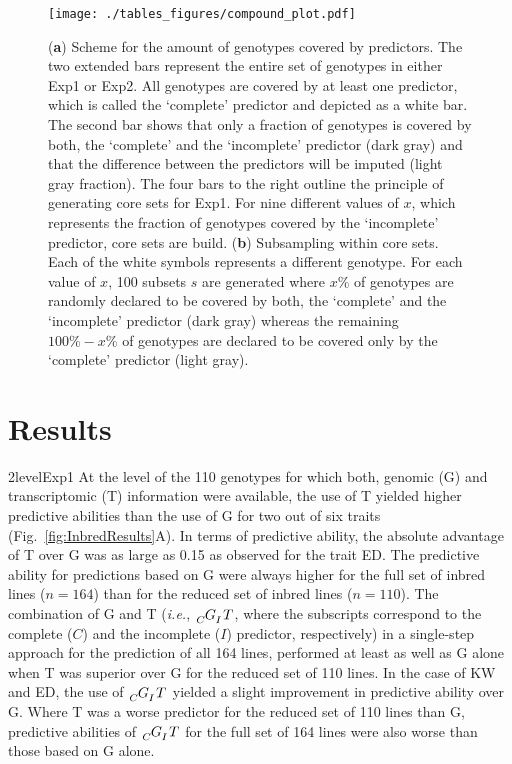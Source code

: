 \documentclass[12pt,titlepage]{article}
\begin{document}
\begin{figure}[H]
  \centering
  \texttt{[image: ./tables\_figures/compound\_plot.pdf]}
  \caption{
  (\textbf{a}) Scheme for the amount of genotypes covered by predictors.
  The two extended bars represent the entire set of genotypes in either
  Exp1 or Exp2.
  All genotypes are covered by at least one predictor, which is called the
  `complete' predictor and depicted as a white bar.
  The second bar shows that only a fraction of genotypes is covered by both,
  the `complete' and the `incomplete' predictor (dark gray) and that the
  difference between the predictors will be imputed (light gray fraction).
  The four bars to the right outline the principle of generating core sets for
  Exp1.
  For nine different values of $x$, which represents the fraction of genotypes
  covered by the `incomplete' predictor, core sets are build.
  (\textbf{b}) Subsampling within core sets.
  Each of the white symbols represents a different genotype.
  For each value of $x$, 100 subsets $s$ are generated where $x\%$ of genotypes
  are randomly declared to be covered by both, the `complete' and the
  `incomplete' predictor (dark gray) whereas the remaining $100\% - x\%$ of
  genotypes are declared to be covered only by the `complete' predictor (light
  gray).
  }
\label{fig:compound-plot}
\end{figure}



\section*{Results}
\Genetics2level{Exp1}
At the level of the 110 genotypes for which both, genomic (G) and 
transcriptomic (T) information were available, the use of T yielded higher
predictive abilities than the use of G for two out of six traits
(Fig.~\ref{fig:InbredResults}A).
In terms of predictive ability, the absolute advantage of T over G was as large 
as 0.15 as observed for the trait ED\@.
The predictive ability for predictions based on G were always higher for the
full set of inbred lines ($n = 164$) than for the reduced set of inbred lines
($n = 110$).
The combination of G and T (\textit{i.e.}, $\tensor[_{C}]{G}{}
\tensor[_{I}]{T}{}$, where the subscripts correspond to the complete ($C$) and
the incomplete ($I$) predictor, respectively) in a single-step approach for the 
prediction of all 164 lines, performed at least as well as G alone when T was 
superior over G for the reduced set of 110 lines.
In the case of KW and ED, the use of $\tensor[_{C}]{G}{}\tensor[_{I}]{T}{}$
yielded a slight improvement in predictive ability over G.
Where T was a worse predictor for the reduced set of 110 lines than G,
predictive abilities of $\tensor[_{C}]{G}{}\tensor[_{I}]{T}{}$ for the full set
of 164 lines were also worse than those based on G alone.
\end{document}
